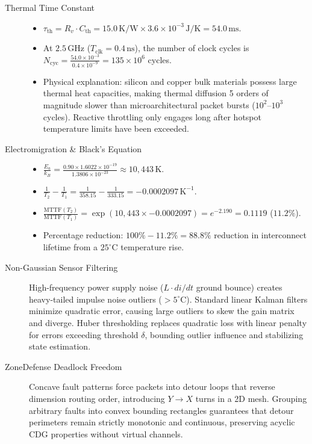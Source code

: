\begin{description}
    \item[Thermal Time Constant]
    \begin{itemize}
        \item $\tau_{\mathrm{th}} = R_v \cdot C_{\mathrm{th}} = 15.0\,\mathrm{K/W} \times 3.6 \times 10^{-3}\,\mathrm{J/K} = 54.0\,\mathrm{ms}$.
        \item At $2.5\,\mathrm{GHz}$ ($T_{\mathrm{clk}} = 0.4\,\mathrm{ns}$), the number of clock cycles is $N_{\mathrm{cyc}} = \frac{54.0 \times 10^{-3}}{0.4 \times 10^{-9}} = 135 \times 10^6$ cycles.
        \item Physical explanation: silicon and copper bulk materials possess large thermal heat capacities, making thermal diffusion 5 orders of magnitude slower than microarchitectural packet bursts ($10^2$--$10^3$ cycles). Reactive throttling only engages long after hotspot temperature limits have been exceeded.
    \end{itemize}

    \item[Electromigration \& Black's Equation]
    \begin{itemize}
        \item $\frac{E_a}{k_B} = \frac{0.90 \times 1.6022 \times 10^{-19}}{1.3806 \times 10^{-23}} \approx 10,443\,\mathrm{K}$.
        \item $\frac{1}{T_2} - \frac{1}{T_1} = \frac{1}{358.15} - \frac{1}{333.15} = -0.0002097\,\mathrm{K^{-1}}$.
        \item $\frac{\mathrm{MTTF}(T_2)}{\mathrm{MTTF}(T_1)} = \exp(10,443 \times -0.0002097) = e^{-2.190} = 0.1119$ ($\mathbf{11.2\%}$).
        \item Percentage reduction: $100\% - 11.2\% = \mathbf{88.8\%}$ reduction in interconnect lifetime from a $25^\circ\mathrm{C}$ temperature rise.
    \end{itemize}

    \item[Non-Gaussian Sensor Filtering] High-frequency power supply noise ($L \cdot di/dt$ ground bounce) creates heavy-tailed impulse noise outliers ($>5^\circ\mathrm{C}$). Standard linear Kalman filters minimize quadratic error, causing large outliers to skew the gain matrix and diverge. Huber thresholding replaces quadratic loss with linear penalty for errors exceeding threshold $\delta$, bounding outlier influence and stabilizing state estimation.

    \item[ZoneDefense Deadlock Freedom] Concave fault patterns force packets into detour loops that reverse dimension routing order, introducing $Y \to X$ turns in a 2D mesh. Grouping arbitrary faults into convex bounding rectangles guarantees that detour perimeters remain strictly monotonic and continuous, preserving acyclic CDG properties without virtual channels.
\end{description}

